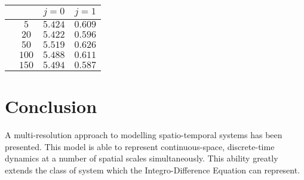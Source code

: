 \documentclass[draftcls,onecolumn]{IEEEtran}
\begin{document}
{{{\begin{table}[!h]
\begin{tabular}{cccc}
&&$j=0$&$j=1$ \\ 
\hline 
&$5$ &$5.424$&$0.609$ \\
&$20$ &$5.422$&$0.596$ \\
&$50$ &$5.519$&$0.626$ \\
&$100$ &$5.488$&$0.611$ \\
&$150$ &$5.494$&$0.587$ \\
\hline \hline
\end{tabular}
\end {table}
\section{Conclusion}
A multi-resolution approach to modelling spatio-temporal systems has been presented. This model is able to represent continuous-space, discrete-time dynamics at a number of spatial scales simultaneously. This ability greatly extends the class of system which the Integro-Difference Equation can represent.


}}}
\end{document}
